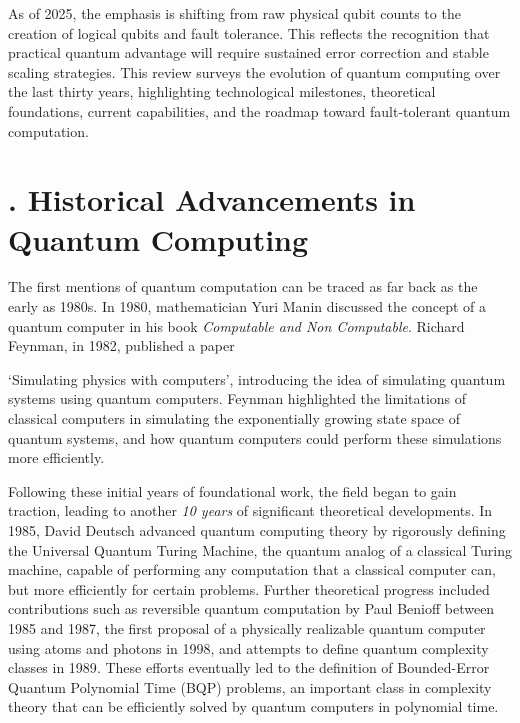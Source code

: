 \documentclass{elbioimp2}
\begin{document}
As of 2025, the emphasis is shifting from raw physical qubit counts to the creation of
logical qubits and fault tolerance. This reflects the recognition that practical quantum
advantage will require sustained error correction and stable scaling strategies. This review
surveys the evolution of quantum computing over the last thirty years, highlighting technological
milestones, theoretical foundations, current capabilities, and the roadmap toward fault-tolerant
quantum computation.

\section{. Historical Advancements in Quantum Computing}
The first mentions of quantum computation can be traced as far back as the early as 1980s.
In 1980, mathematician Yuri Manin discussed the concept of a quantum computer in his book \textit{Computable and Non Computable}\cite{Manin1980}. Richard Feynman, in 1982, published a paper

`Simulating physics with computers', introducing the idea of simulating quantum systems using quantum computers\cite{Feynman1982}. Feynman highlighted the limitations of classical computers in simulating the exponentially growing state space of quantum systems, and how quantum computers could perform these simulations more efficiently.


Following these initial years of foundational work, the field began to gain traction, leading to another \textit{10 years} of significant theoretical developments. In 1985, David Deutsch advanced quantum computing theory by rigorously defining the Universal Quantum Turing Machine, the quantum analog of a classical Turing machine, capable of performing any computation that a classical computer can, but more efficiently for certain problems\cite{Deutsch1985}.
Further theoretical progress included contributions such as reversible quantum computation by Paul Benioff between 1985 and 1987\cite{benioff1986}, the first proposal of a physically realizable quantum computer using atoms and photons in 1998\cite{Igeta:88}, and attempts to define quantum complexity classes in 1989\cite{10.1145/167088.167097}. These efforts eventually led to the definition of Bounded-Error Quantum Polynomial Time (BQP) problems, an important class in complexity theory that can be efficiently solved by quantum computers in polynomial time.
\end{document}

